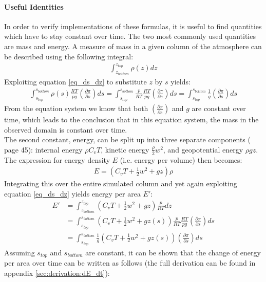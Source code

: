 \paragraph{Useful Identities}
In order to verify implementations of these formulas, it is useful to find quantities which have to stay constant over time.
The two most commonly used quantities are mass and energy.
A measure of mass in a given column of the atmosphere can be described using the following integral:
\begin{align*}
\int_{z_{bottom}}^{z_{top}}\rho(z)dz
\end{align*}
Exploiting equation \ref{eq_ds_dz} to substitute $z$ by $s$ yields:
\begin{align}\label{eq_mass_conservation}
\int_{s_{top}}^{s_{bottom}}\rho(s)\frac{RT}{pg} \left( \frac{\partial \pi}{\partial s} \right) ds = \int_{s_{top}}^{s_{bottom}}\frac{p}{RT}\frac{RT}{pg} \left( \frac{\partial \pi}{\partial s} \right) ds = \int_{s_{top}}^{s_{bottom}}\frac{1}{g}\left( \frac{\partial \pi}{\partial s} \right) ds
\end{align}
From the equation system we know that both $\left( \frac{\partial \pi}{\partial s} \right)$ and $g$ are constant over time, which leads to the conclusion that in this equation system, the mass in the observed domain is constant over time.
\\
The second constant, energy, can be split up into three separate components (\cite{vallis2017atmospheric} page 45): internal energy $\rho C_vT$, kinetic energy $\frac{\rho}{2}w^2$, and geopotential energy $\rho gz$.
The expression for energy density $E$ (i.e. energy per volume) then becomes:
\begin{align*}
E = (C_vT+\frac{1}{2}w^2 + gz)\rho
\end{align*}
Integrating this over the entire simulated column and yet again exploiting equation \ref{eq_ds_dz} yields energy per area $E'$:
\begin{align}
E' &= \int_{z_{bottom}}^{z_{top}} (C_vT+\frac{1}{2}w^2 + gz)\frac{p}{RT} dz\nonumber\\
&=  \int_{s_{top}}^{s_{bottom}} (C_vT+\frac{1}{2}w^2 + gz(s))\frac{p}{RT}\frac{RT}{pg} \left( \frac{\partial \pi}{\partial s} \right) ds\nonumber\\
&=  \int_{s_{top}}^{s_{bottom}} \frac{1}{g}(C_vT+\frac{1}{2}w^2 + gz(s)) \left( \frac{\partial \pi}{\partial s} \right) ds\label{eq_energy}
\end{align}
Assuming $s_{top}$ and $s_{bottom}$ are constant, it can be shown that the change of energy per area over time can be written as follows (the full derivation can be found in appendix \ref{sec:derivation:dE_dt}):
